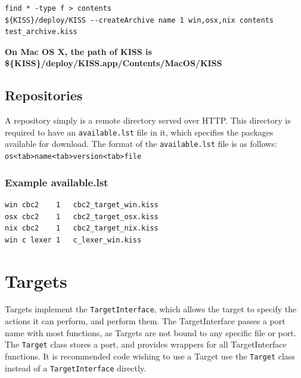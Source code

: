 \documentclass[7pt,letterpaper]{article}
\newcommand{\code}[1]{\texttt{#1}}
\begin{document}
	\begin{lstlisting}
find * -type f > contents
${KISS}/deploy/KISS --createArchive name 1 win,osx,nix contents test_archive.kiss
	\end{lstlisting}
	\vspace{.25in}
	\textbf{On Mac OS X, the path of KISS is \$\{KISS\}/deploy/KISS.app/Contents/MacOS/KISS}
	
	\subsection{Repositories}
	A repository simply is a remote directory served over HTTP. This directory is required to have an \code{available.lst} file in it, which specifies the packages
	available for download. The format of the \code{available.lst} file is as follows: \code{os<tab>name<tab>version<tab>file}
	
	\subsubsection{Example available.lst}
	\begin{lstlisting}
win	cbc2	1	cbc2_target_win.kiss
osx	cbc2	1	cbc2_target_osx.kiss
nix	cbc2	1	cbc2_target_nix.kiss
win	c lexer	1	c_lexer_win.kiss
	\end{lstlisting}
	\vspace{.25in}
	

	\section{Targets}
	Targets implement the \code{TargetInterface}, which allows the target to specify the actions it can perform, and perform them.
	The TargetInterface passes a port name with most functions, as Targets are not bound to any specific file or port.
	The \code{Target} class stores a port, and provides wrappers for all TargetInterface functions. It is recommended code wishing to
	use a Target use the \code{Target} class instead of a \code{TargetInterface} directly.
	
\end{document}
